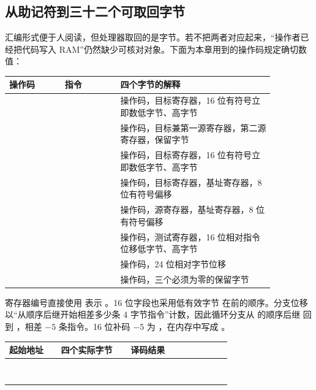 
\subsection{从助记符到三十二个可取回字节}

汇编形式便于人阅读，但处理器取回的是字节。若不把两者对应起来，“操作者已经把代码写入
RAM”仍然缺少可核对对象。下面为本章用到的操作码规定确切数值：

\begin{longtable}{|L{0.18\linewidth}|L{0.18\linewidth}|L{0.50\linewidth}|}
\hline
{}
操作码 & 指令 & 四个字节的解释 \\ \hline
{} &  & 操作码，目标寄存器，16 位有符号立即数低字节、高字节 \\ \hline
{} &  & 操作码，目标兼第一源寄存器，第二源寄存器，保留字节 \\ \hline
{} &  & 操作码，目标寄存器，16 位有符号立即数低字节、高字节 \\ \hline
{} &  & 操作码，目标寄存器，基址寄存器，8 位有符号偏移 \\ \hline
{} &  & 操作码，源寄存器，基址寄存器，8 位有符号偏移 \\ \hline
{} &  & 操作码，测试寄存器，16 位相对指令位移低字节、高字节 \\ \hline
{} &  & 操作码，24 位相对字节位移 \\ \hline
{} &  & 操作码，三个必须为零的保留字节 \\ \hline
\end{longtable}

寄存器编号直接使用  表示 。16 位字段也采用低有效字节
在前的顺序。分支位移以“从顺序后继开始相差多少条 4 字节指令”计数，因此循环分支从
 的顺序后继  回到 ，相差
\(-5\) 条指令。16 位补码 \(-5\) 为 ，在内存中写成
。


\begin{longtable}{|L{0.20\linewidth}|L{0.27\linewidth}|L{0.39\linewidth}|}
\hline
{}
起始地址 & 四个实际字节 & 译码结果 \\ \hline
{} &  &  \\ \hline
{} &  &  \\ \hline
{} &  &  \\ \hline
{} &  &  \\ \hline
{} &  &  \\ \hline
{} &  &  \\ \hline
{} &  &  \\ \hline
{} &  &  \\ \hline
\end{longtable}

